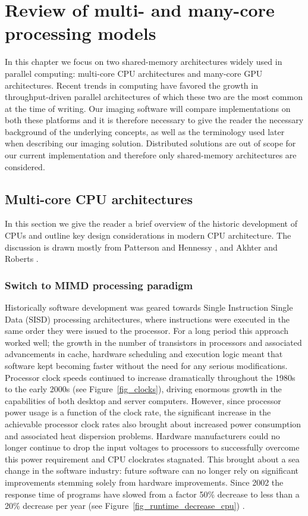 \chapter{Review of multi- and many-core processing models}
In this chapter we focus on two shared-memory architectures widely used in parallel computing: multi-core CPU architectures and many-core GPU architectures. Recent trends in computing
have favored the growth in throughput-driven parallel architectures of which these two are the most common at the time of writing. Our imaging software will compare implementations on both these platforms and it is
therefore necessary to give the reader the necessary background of the underlying concepts, as well as the terminology used later when describing our imaging solution. Distributed solutions are 
out of scope for our current implementation and therefore only shared-memory architectures are considered.
\section{Multi-core CPU architectures}
In this section we give the reader a brief overview of the historic development of CPUs and outline key design considerations in modern CPU architecture. The discussion is drawn mostly from 
Patterson and Hennessy \cite[ch. 1,4,5 and 7]{patterson2009computer}, and Akhter and Roberts \cite[ch. 1,3 and 6]{akhter2006multi}.
\subsection{Switch to MIMD processing paradigm}
Historically software development was geared towards Single Instruction Single Data (SISD) processing architectures, where instructions were executed in the same 
order they were issued to the processor. For a long period this approach worked well; the growth in the number of transistors in processors and associated 
advancements in cache, hardware scheduling and execution logic meant that software kept becoming faster without the need for any serious modifications. Processor clock
speeds continued to increase dramatically throughout the 1980s to the early 2000s (see Figure~\ref{fig_clocks}), driving enormous growth in the capabilities of both
desktop and server computers. However, since processor power usage is a function of the clock rate, the significant increase in the achievable processor clock rates 
also brought about increased power consumption and associated heat dispersion problems. Hardware manufacturers could no longer continue to drop the input 
voltages to processors to successfully overcome this power requirement and CPU clockrates stagnated. This brought about a sea change in the software industry: 
future software can no longer rely on significant improvements stemming solely from hardware improvements. Since 2002 the response time of programs have slowed 
from a factor 50\% decrease to less than a 20\% decrease per year (see Figure~\ref{fig_runtime_decrease_cpu}) \cite{patterson2009computer}.

